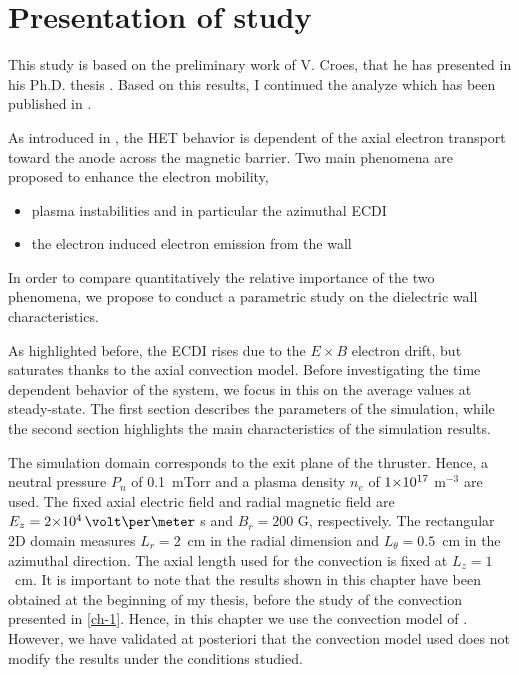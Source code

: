 
\section{Presentation of study}
  \label{sec-params}
  
  \begin{Chabstract}
    
  This study is based on the preliminary work of V. Croes, that he has presented in his Ph.D. thesis \citep{croes2017}.
  Based on this results, I continued the analyze which has been published in  \citet*{tavant2018}.
\end{Chabstract}
  
  \vspace{1ex}
  
  
  As introduced in , the \ac{HET} behavior is dependent of the axial electron transport toward the anode across the magnetic barrier.
  Two main phenomena are proposed to enhance the electron mobility,
  \begin{itemize}
    \item plasma instabilities and in particular the azimuthal \ac{ECDI}
    \item the electron induced electron emission from the wall
  \end{itemize}
  In order to compare quantitatively the relative importance of the two phenomena, we propose to conduct a parametric study on the dielectric wall characteristics.

  As highlighted before, the \ac{ECDI} rises due to the $E \times B$ electron drift, but saturates thanks to the axial convection model.
  Before investigating the time dependent behavior of the system, we focus in this  on the average values at steady-state.
  The first section describes the parameters of the simulation, 
  while the second section highlights the main characteristics of the simulation results.

  
  The simulation domain corresponds to the exit plane of the thruster.
  Hence, a neutral pressure $P_n$ of 0.1~mTorr and a plasma density $n_e$ of ${{1}{\times}10^{17}}$ m$^{-3}$ are used.
  The fixed axial electric field and radial magnetic field are $E_z=\sn{2}{4}\,\volt\per\meter$ s and $B_r=200$ G, respectively.
  The rectangular \ac{2D} domain measures $L_r=2$~cm in the radial dimension and $L_{\theta}=0.5$~cm in the azimuthal direction.
  The axial length used for the convection is fixed at $L_z=1$~cm.
  It is important to note that the results shown in this chapter have been obtained at the beginning of my thesis, before the study of the convection presented in \cref{ch-1}.
  Hence, in this chapter we use the convection model of \citet{lafleur2016a}.
  However, we have validated at posteriori that the convection model used does not modify the results under the conditions studied.
  
